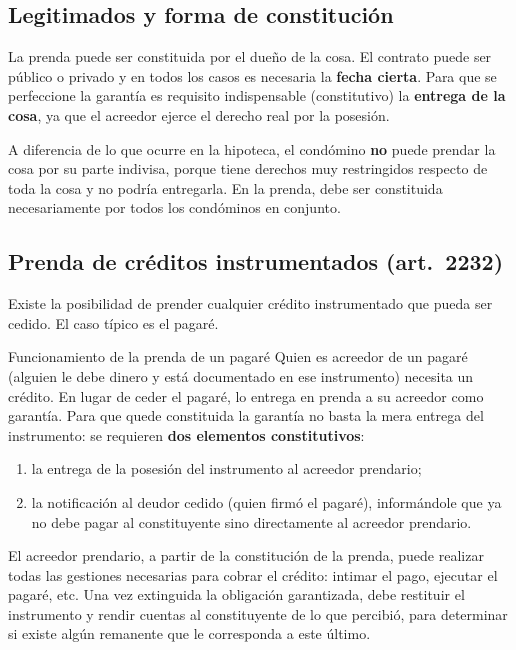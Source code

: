 \documentclass[12pt,oneside]{book}
\begin{document}
\subsection{Legitimados y forma de constitución}

La prenda puede ser constituida por el dueño de la cosa. El contrato puede ser público o privado y en todos los casos es necesaria la \textbf{fecha cierta}. Para que se perfeccione la garantía es requisito indispensable (constitutivo) la \textbf{entrega de la cosa}, ya que el acreedor ejerce el derecho real por la posesión.

\begin{nota}
A diferencia de lo que ocurre en la hipoteca, el condómino \textbf{no} puede prendar la cosa por su parte indivisa, porque tiene derechos muy restringidos respecto de toda la cosa y no podría entregarla. En la prenda, debe ser constituida necesariamente por todos los condóminos en conjunto.
\end{nota}

\subsection{Prenda de créditos instrumentados (art.~2232)}

Existe la posibilidad de prender cualquier crédito instrumentado que pueda ser cedido. El caso típico es el pagaré.

\begin{ejemplo}{Funcionamiento de la prenda de un pagaré}
Quien es acreedor de un pagaré (alguien le debe dinero y está documentado en ese instrumento) necesita un crédito. En lugar de ceder el pagaré, lo entrega en prenda a su acreedor como garantía. Para que quede constituida la garantía no basta la mera entrega del instrumento: se requieren \textbf{dos elementos constitutivos}:
\begin{enumerate}
    \item la entrega de la posesión del instrumento al acreedor prendario;
    \item la notificación al deudor cedido (quien firmó el pagaré), informándole que ya no debe pagar al constituyente sino directamente al acreedor prendario.
\end{enumerate}
\end{ejemplo}

El acreedor prendario, a partir de la constitución de la prenda, puede realizar todas las gestiones necesarias para cobrar el crédito: intimar el pago, ejecutar el pagaré, etc. Una vez extinguida la obligación garantizada, debe restituir el instrumento y rendir cuentas al constituyente de lo que percibió, para determinar si existe algún remanente que le corresponda a este último.
\end{document}

